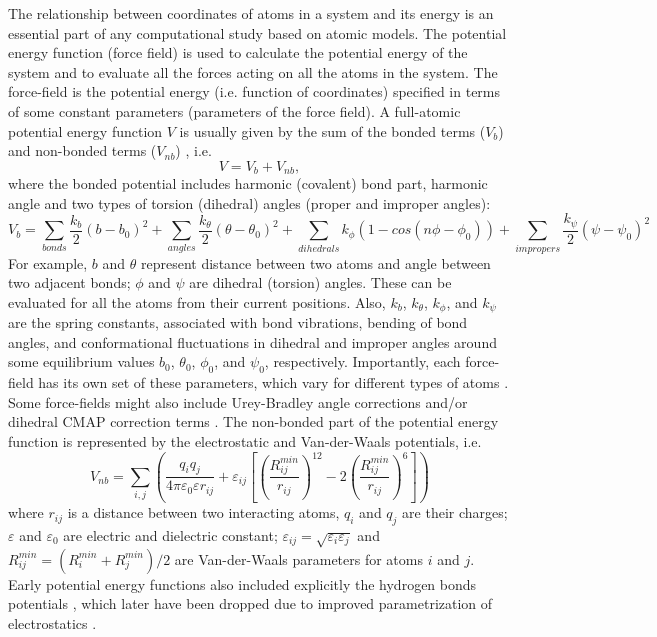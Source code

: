 \documentclass[11pt]{book}
\begin{document}
The relationship between coordinates of atoms in a system and its energy is an essential part of any computational study based on atomic models. The potential energy function (force field) \cite{MacKerellJPC98,MacKerellJCC04} is used to calculate the potential energy of the system and to evaluate all the forces acting on all the atoms in the system. The force-field is the potential energy (i.e. function of coordinates) specified in terms of some constant parameters (parameters of the force field). A full-atomic potential energy function $V$ is usually given by the sum of the bonded terms ($V_{b}$) and non-bonded terms ($V_{nb}$) \cite{Charmm83,Charmm09,Namd05,Gromacs08,Amber05}, i.e.
\begin{equation}\label{eq:ff}
V = V_{b} + V_{nb},
\end{equation}
where the bonded potential includes harmonic (covalent) bond part, harmonic angle and two types of torsion (dihedral) angles (proper and improper angles):
\begin{equation}\label{eq:ff-bonded}
V_{b} = \sum_{bonds}\frac{k_b}{2}(b-b_0)^2 + \sum_{angles}\frac{k_{\theta}}{2}(\theta-\theta_0)^2 + \sum_{dihedrals}k_{\phi}(1-cos(n\phi - \phi_0)) + \sum_{impropers}\frac{k_{\psi}}{2}(\psi-\psi_0)^2
\end{equation}
For example, $b$ and $\theta$ represent distance between two atoms and angle between two adjacent bonds; $\phi$ and $\psi$ are dihedral (torsion) angles. These can be evaluated for all the atoms from their current positions. Also, $k_b$, $k_{\theta}$, $k_{\phi}$, and $k_{\psi}$ are the spring constants, associated with bond vibrations, bending of bond angles, and conformational fluctuations in dihedral and improper angles around some equilibrium values $b_0$, $\theta_0$, $\phi_0$, and $\psi_0$, respectively. Importantly, each force-field has its own set of these parameters, which vary for different types of atoms \cite{Charmm83,GromacsManual}. Some force-fields might also include Urey-Bradley angle corrections \cite{Charmm83} and/or dihedral CMAP correction terms \cite{MacKerellJACS04,MacKerellJCC04-CMAP,Charmm09}. The non-bonded part of the potential energy function is represented by the electrostatic and Van-der-Waals potentials, i.e.
\begin{equation}\label{eq:ff-nb}
V_{nb} = \sum_{i,j}\left(\frac{q_{i}q_{j}}{4\pi\varepsilon_{0}\varepsilon r_{ij}} + \varepsilon_{ij}\left[\left(\frac{R^{min}_{ij}}{r_{ij}}\right)^{12}-2\left(\frac{R^{min}_{ij}}{r_{ij}}\right)^{6}\right]\right)
\end{equation}
where $r_{ij}$ is a distance between two interacting atoms, $q_{i}$ and $q_{j}$ are their charges; $\varepsilon$ and $\varepsilon_{0}$ are electric and dielectric constant; $\varepsilon_{ij}=\sqrt{\varepsilon_i\varepsilon_j}$ and $R_{ij}^{min} = (R_{i}^{min} + R_{j}^{min})/2$ are Van-der-Waals parameters for atoms $i$ and $j$. Early potential energy functions also included explicitly the hydrogen bonds potentials \cite{Charmm83}, which later have been dropped due to improved parametrization of electrostatics \cite{Charmm09}.
\end{document}
